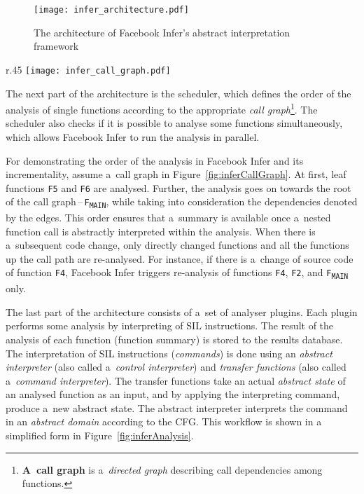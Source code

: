 \begin{figure}[hbt]
    \centering
    \texttt{[image: infer\_architecture.pdf]}
    \caption{%
        The architecture of Facebook Infer's abstract interpretation
        framework~\cite{inferAISlides, projectPracticeMarcin2018}
    }
    \label{fig:inferArch}
\end{figure}

\begin{wrapfigure}{r}{.45 \linewidth}
    \centering
    \vspace{-1em}
    \texttt{[image: infer\_call\_graph.pdf]}
    \caption{%
        A~call graph for an illustration of Facebook Infer's
        analysis process~\cite{inferAISlides, excel2019FBInfer,
        projectPracticeMarcin2018}
    }
    \label{fig:inferCallGraph}
\end{wrapfigure}
The next part of the architecture is the scheduler, which defines the
order of the analysis of single functions according to the appropriate
\emph{call graph}\footnote{\textbf{A~call graph} is a~\emph{directed graph}
describing call dependencies among functions.}. The scheduler also checks
if it is possible to analyse some functions simultaneously, which allows
Facebook Infer to run the analysis in parallel.

\begin{example}
    For demonstrating the order of the analysis in Facebook Infer and its
    incrementality, assume a~call graph in Figure~\ref{fig:inferCallGraph}.
    At first, leaf functions \texttt{F5} and \texttt{F6} are analysed.
    Further, the analysis goes on towards the root of the call
    graph\,--\,\texttt{F\textsubscript{MAIN}}, while taking into
    consideration the dependencies denoted by the edges. This order ensures
    that a~summary is available once a~nested function call is abstractly
    interpreted within the analysis. When there is a~subsequent code change,
    only directly changed functions and all the functions up the call path
    are re-analysed. For instance, if there is a~change of source code of
    function \texttt{F4}, Facebook Infer triggers re-analysis of
    functions \texttt{F4}, \texttt{F2}, and \texttt{F\textsubscript{MAIN}}
    only.
\end{example}

The last part of the architecture consists of a~set of analyser plugins.
Each plugin performs some analysis by interpreting of SIL instructions.
The result of the analysis of each function (function summary) is stored to
the results database. The interpretation of SIL instructions (\emph{commands})
is done using an \emph{abstract interpreter} (also called a~\emph{control
interpreter}) and \emph{transfer functions} (also called a~\emph{command
interpreter}). The transfer functions take an actual \emph{abstract state}
of an analysed function as an input, and by applying the interpreting command,
produce a~new abstract state. The abstract interpreter interprets the
command in an \emph{abstract domain} according to the CFG. This workflow is
shown in a simplified form in Figure~\ref{fig:inferAnalysis}.

